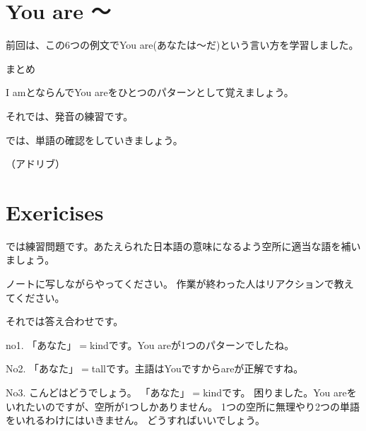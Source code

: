 \documentclass[book,jafontscale=0.9247]{jlreq}
\newcommand{\mySagyo}{%
\begin{minipage}[t]{.98\textwidth}
\mbox{}\hrulefill\mbox{}\par%
\mbox{}\hfill{}\raisebox{-5pt}{作業}\hfill\mbox{}\par%
\mbox{}\hrulefill\mbox{}
\end{minipage}%
\par%
\bigskip
}
\begin{document}
\newpage
\section{You are 〜}
{\large \ComputerMouse}

%
%
%
%
%
%
%
%
%
%

前回は、この6つの例文でYou are(あなたは〜だ)という言い方を学習しました。


まとめ

I amとならんでYou areをひとつのパターンとして覚えましょう。

それでは、発音の練習です。

では、単語の確認をしていきましょう。

（アドリブ）

\newpage
\section{Exericises}

では練習問題です。あたえられた日本語の意味になるよう空所に適当な語を補いましょう。

ノートに写しながらやってください。
作業が終わった人はリアクションで教えてください。

\mySagyo

それでは答え合わせです。

no1.
「あなた」$=$kindです。You areが1つのパターンでしたね。

No2.
「あなた」$=$tallです。主語はYouですからareが正解ですね。

No3.
こんどはどうでしょう。
「あなた」$=$kindです。
困りました。You areをいれたいのですが、空所が1つしかありません。
1つの空所に無理やり2つの単語をいれるわけにはいきません。
どうすればいいでしょう。
\end{document}
